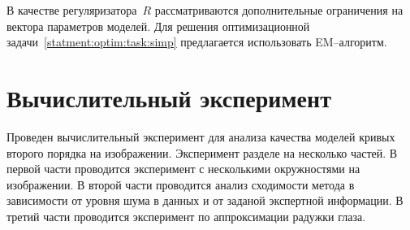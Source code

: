 \documentclass[12pt, twoside]{article}
\numberwithin{equation}{section}
\begin{document}
В качестве регуляризатора~$R$ рассматриваются дополнительные ограничения на вектора параметров моделей. Для решения оптимизационной задачи~\eqref{statment:optim:task:simp} предлагается использовать EM--алгоритм.

\section{Вычислительный эксперимент}
Проведен вычислительный эксперимент для анализа качества моделей кривых второго порядка на изображении. Эксперимент разделе на несколько частей. В первой части проводится эксперимент с несколькими окружностями на изображении. В второй части проводится анализ сходимости метода в зависимости от уровня шума в данных и от заданой экспертной информации. В третий части проводится эксперимент по аппроксимации радужки глаза.
\end{document}
